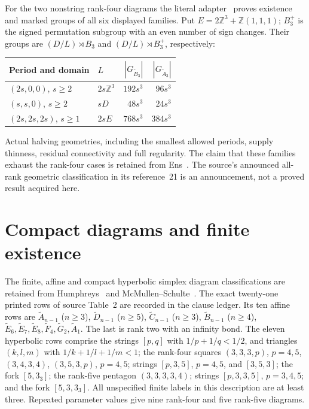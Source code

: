 \documentclass[11pt,a4paper]{article}
\newcommand{\Z}{\mathbb Z}
\begin{document}
For the two nonstring rank-four diagrams the literal adapter~\cite{period}
proves existence and marked groups of all six displayed families. Put
$E=2\Z^3+\Z(1,1,1)$; $B_3^+$ is the signed permutation subgroup with an
even number of sign changes. Their groups are $(D/L)\rtimes B_3$ and
$(D/L)\rtimes B_3^+$, respectively:
\begin{center}\small
\begin{tabular}{llrr}\toprule
Period and domain &$L$&$|G_{\widetilde B_3}|$&$|G_{\widetilde A_3}|$\\\midrule
$(2s,0,0)$, $s\ge2$&$2s\Z^3$&$192s^3$&$96s^3$\\
$(s,s,0)$, $s\ge2$&$sD$&$48s^3$&$24s^3$\\
$(2s,2s,2s)$, $s\ge1$&$2sE$&$768s^3$&$384s^3$\\\bottomrule
\end{tabular}
\end{center}
Actual halving geometries, including the smallest allowed periods, supply
thinness, residual connectivity and full regularity. The claim that these
families exhaust the rank-four cases is retained from Ens~\cite{Ens}.
The source's announced all-rank geometric classification in its reference~21
is an announcement, not a proved result acquired here.

\section{Compact diagrams and finite existence}\label{hyperbolic}
The finite, affine and compact hyperbolic simplex diagram classifications
are retained from Humphreys~\cite{Humphreys} and
McMullen--Schulte~\cite{Polytopes}. The exact twenty-one printed rows of
source Table~2 are recorded in the clause ledger. Its ten affine rows are
$\widetilde A_{n-1}$ ($n\ge3$), $\widetilde D_{n-1}$ ($n\ge5$),
$\widetilde C_{n-1}$ ($n\ge3$), $\widetilde B_{n-1}$ ($n\ge4$),
$\widetilde E_6,\widetilde E_7,\widetilde E_8,\widetilde F_4,
\widetilde G_2,\widetilde A_1$. The last is rank two with an infinity bond.
The eleven hyperbolic rows comprise the strings $[p,q]$ with
$1/p+1/q<1/2$, and triangles $(k,l,m)$ with $1/k+1/l+1/m<1$;
the rank-four squares $(3,3,3,p)$, $p=4,5$, $(3,4,3,4)$,
$(3,5,3,p)$, $p=4,5$; strings $[p,3,5]$, $p=4,5$, and $[3,5,3]$;
the fork $[5,3_3]$; the rank-five pentagon $(3,3,3,3,4)$;
strings $[p,3,3,5]$, $p=3,4,5$; and the fork $[5,3,3_3]$.
All unspecified finite labels in this description are at least three.
Repeated parameter values give nine rank-four and five rank-five diagrams.
\end{document}
